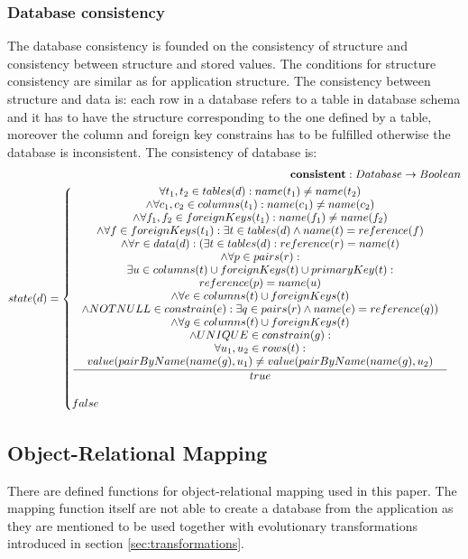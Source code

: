 \documentclass[11pt]{article}
\begin{document}
\subsubsection{Database consistency}
The database consistency is founded on the consistency of structure and consistency between structure and stored values. The conditions for structure consistency are similar as for application structure. The consistency between structure and data is:  each row in a database  refers to a table in database schema and it has to have the structure corresponding to the one defined by a table, moreover the column and foreign key constrains has to be fulfilled  otherwise the database is inconsistent. The consistency of database is:
\begin{align*}
	\mathbf{consistent} : Database \rightarrow Boolean \\
	state(d) = \begin{cases}
 		\inference{ \forall t_1, t_2 \in tables(d) : name(t_1) \neq name(t_2) \\ \wedge \forall c_1, c_2 \in columns(t_1) : name(c_1) \neq name(c_2) \\ \wedge \forall f_1, f_2 \in foreignKeys(t_1) : name(f_1) \neq name (f_2) \\ \wedge \forall f \in foreignKeys(t_1) : \exists t \in tables(d) \wedge name(t) = reference(f) \\ \wedge \forall r \in data(d): ( \exists t \in tables(d) : reference(r) = name(t) \\ \wedge \forall p \in pairs(r) :\\ \exists u \in columns(t) \cup foreignKeys(t) \cup primaryKey(t) : \\ reference(p) = name(u) \\ \wedge \forall e \in columns(t) \cup foreignKeys(t) \\ \wedge NOTNULL \in constrain(e) : \exists q \in pairs(r) \wedge name(e) = reference(q)) \\ \wedge \forall g \in columns(t) \cup foreignKeys(t) \\ \wedge UNIQUE \in constrain(g) : \\ \forall u_1, u_2 \in rows(t) : \\ value(pairByName(name(g), u_1) \neq value(pairByName(name(g), u_2) }{true}
 	\\ \\
 	false
 \end{cases}
\end{align*}
 

\subsection{Object-Relational Mapping}
\label{sec:orm}
There are defined functions for object-relational mapping used in this paper. The mapping function itself are not able to create a database from the application as they are mentioned to be used together with evolutionary transformations introduced in section \ref{sec:transformations}.
\end{document}
